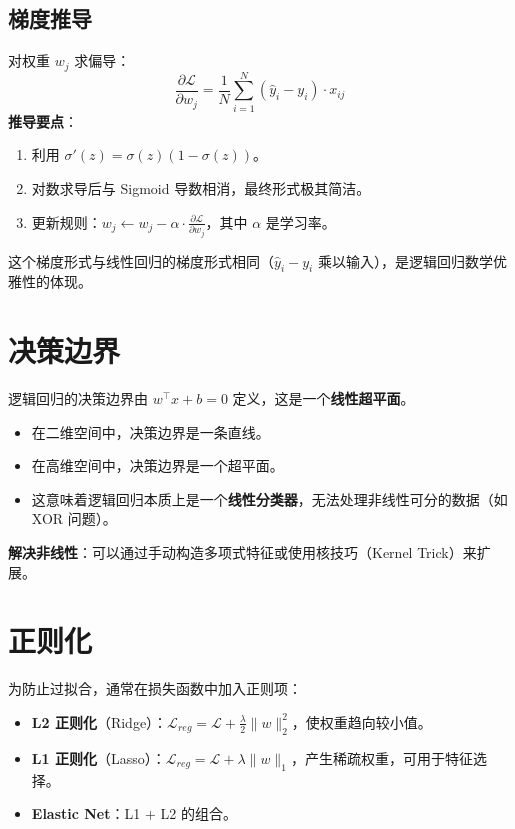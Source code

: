 \documentclass[12pt, a4paper]{book}
\begin{document}
\subsection{梯度推导}
对权重 $w_j$ 求偏导：
$$ \frac{\partial \mathcal{L}}{\partial w_j} = \frac{1}{N} \sum_{i=1}^N (\hat{y}_i - y_i) \cdot x_{ij} $$
\textbf{推导要点}：
\begin{enumerate}
    \item 利用 $\sigma'(z) = \sigma(z)(1 - \sigma(z))$。
    \item 对数求导后与 Sigmoid 导数相消，最终形式极其简洁。
    \item 更新规则：$w_j \leftarrow w_j - \alpha \cdot \frac{\partial \mathcal{L}}{\partial w_j}$，其中 $\alpha$ 是学习率。
\end{enumerate}
这个梯度形式与线性回归的梯度形式相同（$\hat{y}_i - y_i$ 乘以输入），是逻辑回归数学优雅性的体现。

\section{决策边界}
逻辑回归的决策边界由 $w^\top x + b = 0$ 定义，这是一个\textbf{线性超平面}。
\begin{itemize}
    \item 在二维空间中，决策边界是一条直线。
    \item 在高维空间中，决策边界是一个超平面。
    \item 这意味着逻辑回归本质上是一个\textbf{线性分类器}，无法处理非线性可分的数据（如 XOR 问题）。
\end{itemize}
\textbf{解决非线性}：可以通过手动构造多项式特征或使用核技巧（Kernel Trick）来扩展。

\section{正则化}
为防止过拟合，通常在损失函数中加入正则项：
\begin{itemize}
    \item \textbf{L2 正则化}（Ridge）：$\mathcal{L}_{reg} = \mathcal{L} + \frac{\lambda}{2} \|w\|_2^2$，使权重趋向较小值。
    \item \textbf{L1 正则化}（Lasso）：$\mathcal{L}_{reg} = \mathcal{L} + \lambda \|w\|_1$，产生稀疏权重，可用于特征选择。
    \item \textbf{Elastic Net}：L1 + L2 的组合。
\end{itemize}
\end{document}
